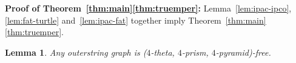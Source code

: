 \documentclass[a4paper]{article}
\newtheorem{lemma}[theorem]{Lemma}
\begin{document}
\noindent \textbf{Proof of Theorem~\ref{thm:main}\ref{thm:truemper}:} Lemma~\ref{lem:ipac-ipco}, \ref{lem:fat-turtle} and~\ref{lem:ipac-fat} together imply Theorem~\ref{thm:main}\ref{thm:truemper}.






 \begin{lemma}\label{lem:outer-truemper}
 Any outerstring graph is ($4$-theta, $4$-prism, $4$-pyramid)-free.
 \end{lemma}
\end{document}
